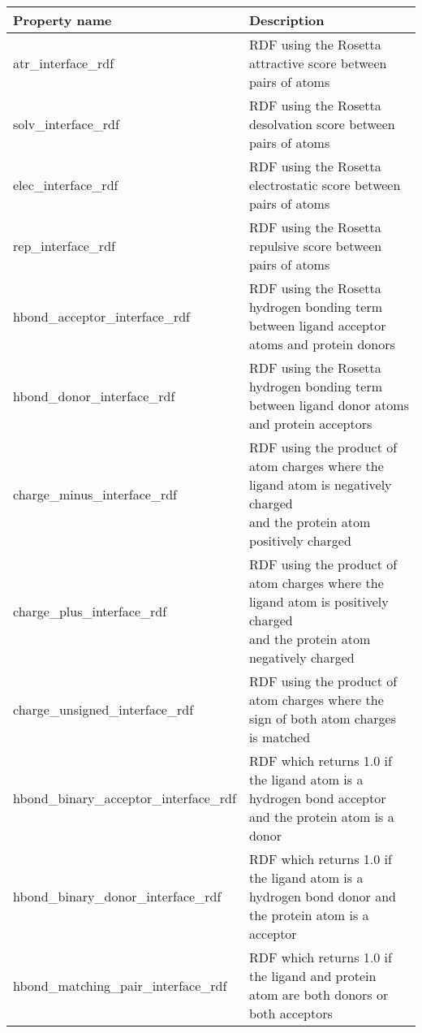 \begin{tabular}{|l|l|}
\hline
\textbf{Property name} & \textbf{Description} \\
\hline
\hline
atr\_interface\_rdf & RDF using the Rosetta attractive score between pairs of atoms\\
\hline
solv\_interface\_rdf & RDF using the Rosetta desolvation score between pairs of atoms \\
\hline
elec\_interface\_rdf & RDF using the Rosetta electrostatic score between pairs of atoms\\
\hline
rep\_interface\_rdf & RDF using the Rosetta repulsive score between pairs of atoms \\
\hline
hbond\_acceptor\_interface\_rdf & RDF using the Rosetta hydrogen bonding term between ligand acceptor atoms and protein donors\\
\hline
hbond\_donor\_interface\_rdf & RDF using the Rosetta hydrogen bonding term between ligand donor atoms and protein acceptors\\
\hline
charge\_minus\_interface\_rdf & \pbox{4in}{RDF using the product of atom charges where the ligand atom is negatively charged \\
and the protein atom positively charged}\\
\hline
charge\_plus\_interface\_rdf & \pbox{4in}{RDF using the product of atom charges where the ligand atom is positively charged \\
and the protein atom negatively charged}\\
\hline
charge\_unsigned\_interface\_rdf & RDF using the product of atom charges where the sign of both atom charges is matched  \\
\hline
hbond\_binary\_acceptor\_interface\_rdf & RDF which returns 1.0 if the ligand atom is a hydrogen bond acceptor and the protein atom is a donor\\
\hline 
hbond\_binary\_donor\_interface\_rdf & RDF which returns 1.0 if the ligand atom is a hydrogen bond donor and the protein atom is a acceptor\\
\hline 
hbond\_matching\_pair\_interface\_rdf & RDF which returns 1.0 if the ligand and protein atom are both donors or both acceptors\\
\hline
\end{tabular}

